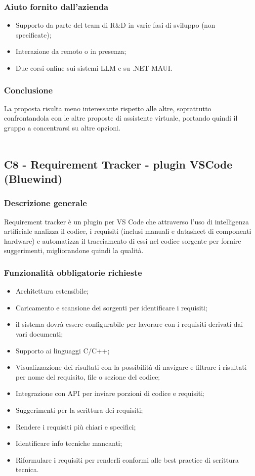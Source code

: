 \documentclass[10pt]{article}
\begin{document}
\subsubsection{Aiuto fornito dall'azienda}
\begin{itemize}
\item Supporto da parte del team di R\&D in varie fasi di sviluppo (non specificate);
\item Interazione da remoto o in presenza;
\item Due corsi online sui sistemi LLM e su .NET MAUI.

\end{itemize}
\subsubsection{Conclusione}
La proposta risulta meno interessante rispetto alle altre, soprattutto confrontandola con le altre proposte di assistente virtuale, portando quindi il gruppo a concentrarsi su altre opzioni.
\\\\

\subsection{C8 - Requirement Tracker - plugin VSCode (Bluewind)}
\subsubsection{Descrizione generale}
Requirement tracker è un plugin per VS Code che attraverso l’uso di intelligenza artificiale analizza il codice, i requisiti (inclusi manuali e datasheet di componenti hardware) e automatizza il tracciamento di essi nel codice sorgente per fornire suggerimenti, migliorandone quindi la qualità.
\subsubsection{Funzionalità obbligatorie richieste}
\begin{itemize}
    \item Architettura estensibile;
    \item Caricamento e scansione dei sorgenti per identificare i requisiti;
    \item il sistema dovrà essere configurabile per lavorare con i requisiti derivati dai vari documenti;
    \item Supporto ai linguaggi C/C++;
    \item Visualizzazione dei risultati con la possibilità di navigare e filtrare i risultati per nome del requisito, file o sezione del codice;
    \item Integrazione con API per inviare porzioni di codice e requisiti;
    \item Suggerimenti per la scrittura dei requisiti;
    \item Rendere i requisiti più chiari e specifici;
    \item Identificare info tecniche mancanti;
    \item Riformulare i requisiti per renderli conformi alle best practice di scrittura tecnica.
\end{itemize}
\end{document}

